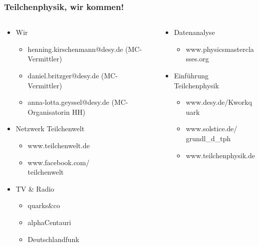 \begin{frame}
  \frametitle{Teilchenphysik, wir kommen!}
  \vskip-0.5cm
  \begin{footnotesize}
    \begin{columns}[t]
      \begin{column}{0.55\textwidth}
        \begin{itemize}
        \item Wir
          \begin{itemize}
          \item henning.kirschenmann@desy.de (MC-Vermittler)
          \item daniel.britzger@desy.de (MC-Vermittler)
          \item anna-lotta.geyssel@desy.de (MC-Organisatorin HH)
          \end{itemize}
        \item Netzwerk Teilchenwelt
          \begin{itemize}
          \item www.teilchenwelt.de
          \item www.facebook.com/\\teilchenwelt
          \end{itemize}
        \item TV \& Radio
          \begin{itemize}
          \item quarks\&co
          \item alphaCentauri
          \item Deutschlandfunk
          \end{itemize}
        \end{itemize}
      \end{column}
      \begin{column}{0.5\textwidth}
        \begin{itemize}
        \item Datenanalyse
          \begin{itemize}
          \item www.physicsmasterclasses.org
          \end{itemize}
        \item Einf\"uhrung Teilchenphysik
          \begin{itemize}
          \item www.desy.de/Kworkquark
          \item www.solstice.de/\\grundl\_d\_tph
          \item www.teilchenphysik.de

\end{itemize}
\end{itemize}
\end{column}
\end{columns}
\end{footnotesize}
\end{frame}
